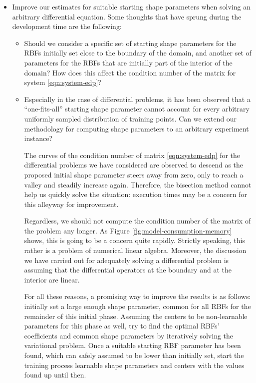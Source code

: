 \documentclass[12pt]{report} %
\begin{document}
\begin{itemize}
  \item Improve our estimates for suitable starting shape parameters when solving an arbitrary differential equation. Some thoughts that have sprung during the development time are the following:
  \begin{itemize}
    \item Should we consider a specific set of starting shape parameters for the RBFs initially set close to the boundary of the domain, and another set of parameters for the RBFs that are initially part of the interior of the domain? How does this affect the condition number of the matrix for system \eqref{eqn:system-edp}?
    \item Especially in the case of differential problems, it has been observed that a ``one-fits-all'' starting shape parameter cannot account for every arbitrary uniformly sampled distribution of training points. Can we extend our methodology for computing shape parameters to an arbitrary experiment instance? 
    
    The curves of the condition number of matrix \eqref{eqn:system-edp} for the differential problems we have considered are observed to descend as the proposed initial shape parameter steers away from zero, only to reach a valley and steadily increase again. Therefore, the bisection method cannot help us quickly solve the situation: execution times may be a concern for this alleyway for improvement.

    Regardless, we should not compute the condition number of the matrix of the problem any longer. As Figure \ref{fig:model-consumption-memory} shows, this is going to be a concern quite rapidly. Strictly speaking, this rather is a problem of numerical linear algebra. Moreover, the discussion we have carried out for adequately solving a differential problem is assuming that the differential operators at the boundary and at the interior are linear. 

    For all these reasons, a promising way to improve the results is as follows: initially set a large enough shape parameter, common for all RBFs for the remainder of this initial phase. Assuming the centers to be non-learnable parameters for this phase as well, try to find the optimal RBFs' coefficients and common shape parameters by iteratively solving the variational problem. Once a suitable starting RBF parameter has been found, which can safely assumed to be lower than initially set, start the training process learnable shape parameters and centers with the values found up until then.
  \end{itemize}
  


\end{itemize}
\end{document}
